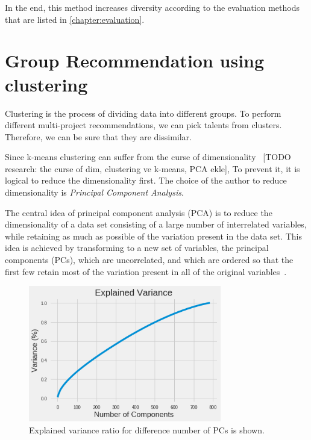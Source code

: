 In the end, this method increases diversity according to the evaluation methods that are listed in \autoref{chapter:evaluation}.

\section{Group Recommendation using clustering}

Clustering is the process of dividing data into different groups. To perform different multi-project recommendations, we can pick talents from clusters. Therefore, we can be sure that they are dissimilar. 

Since k-means clustering can suffer from the curse of dimensionality~\parencite{steinbach2004challenges} [TODO research: the curse of dim, clustering ve k-means, PCA ekle], To prevent it, it is logical to reduce the dimensionality first. The choice of the author to reduce dimensionality is \textit{Principal Component Analysis}.

The central idea of principal component analysis (PCA) is to reduce the
dimensionality of a data set consisting of a large number of interrelated
variables, while retaining as much as possible of the variation present in
the data set. This idea is achieved by transforming to a new set of variables,
the principal components (PCs), which are uncorrelated, and which are
ordered so that the first few retain most of the variation present in all of
the original variables~\parencite{jolliffe2011principal}. 

 \begin{figure}[!ht]
	\centering
	\includegraphics[width=0.75\textwidth]{figures/PCAExplainedVariance.png}
	\caption{Explained variance ratio for difference number of PCs is shown.}
	\label{fig:pca-explained-variance}
\end{figure}

